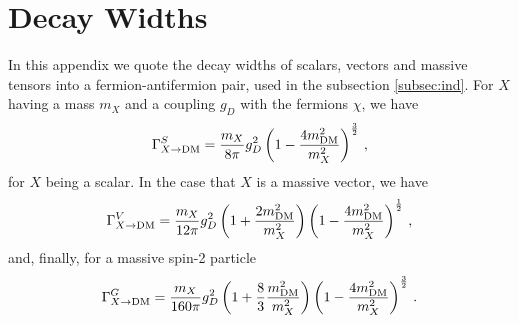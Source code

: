 \documentclass[aps,prd,reprint,twocolumn,preprintnumbers,floatfix,nofootinbib]{revtex4-1}
\begin{document}
\section{Decay Widths}\label{ap:A1}

In this appendix we quote the decay widths of scalars, vectors and massive tensors into a fermion-antifermion pair, used in the subsection \ref{subsec:ind}. For $X$ having a mass $m_X$ and a coupling $g_D$ with the fermions $\chi$, we have
\begin{align}
    \Gamma_{X\to {\rm DM}}^S = \frac{m_X}{8\pi}g_D^2\left(1-\frac{4m_{\rm DM}^2}{m_X^2}\right)^\frac{3}{2}\,,
\end{align}
for $X$ being a scalar. In the case that $X$ is a massive vector, we have
\begin{align}
    \Gamma_{X\to {\rm DM}}^V= \frac{m_X}{12\pi}g_D^2\left(1+\frac{2m_{\rm DM}^2}{m_X^2}\right)\left(1-\frac{4m_{\rm DM}^2}{m_X^2}\right)^\frac{1}{2}\,,
\end{align}
and, finally, for a massive spin-2 particle~\cite{Han:1998sg,Lee:2013bua,Falkowski:2016glr}
\begin{align}
    \Gamma_{X\to {\rm DM}}^G = \frac{m_X}{160\pi}g_D^2\left(1+\frac{8}{3}\frac{m_{\rm DM}^2}{m_X^2}\right)\left(1-\frac{4m_{\rm DM}^2}{m_X^2}\right)^\frac{3}{2}\,.
\end{align}





\end{document}
